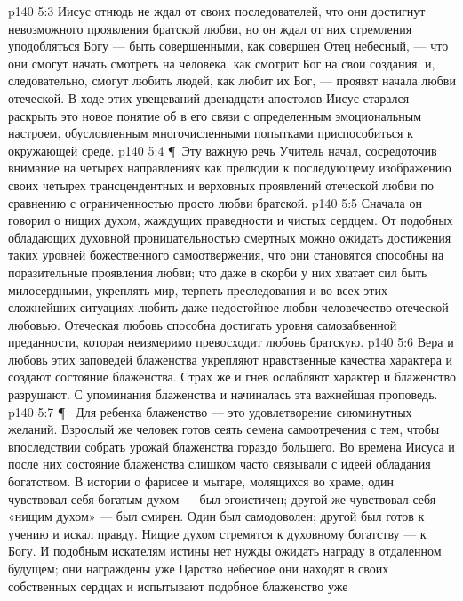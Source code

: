 \vs p140 5:3 Иисус отнюдь не ждал от своих последователей, что они достигнут невозможного проявления братской любви, но он ждал от них стремления уподобляться Богу --- быть совершенными, как совершен Отец небесный, --- что они смогут начать смотреть на человека, как смотрит Бог на свои создания, и, следовательно, смогут любить людей, как любит их Бог, --- проявят начала любви отеческой. В ходе этих увещеваний двенадцати апостолов Иисус старался раскрыть это новое понятие об  в его связи с определенным эмоциональным настроем, обусловленным многочисленными попытками приспособиться к окружающей среде.
\vs p140 5:4 \P\ Эту важную речь Учитель начал, сосредоточив внимание на четырех направлениях  как прелюдии к последующему изображению своих четырех трансцендентных и верховных проявлений отеческой любви по сравнению с ограниченностью просто любви братской.
\vs p140 5:5 Сначала он говорил о нищих духом, жаждущих праведности и чистых сердцем. От подобных обладающих духовной проницательностью смертных можно ожидать достижения таких уровней божественного самоотвержения, что они становятся способны на поразительные проявления  любви; что даже в скорби у них хватает сил быть милосердными, укреплять мир, терпеть преследования и во всех этих сложнейших ситуациях любить даже недостойное любви человечество отеческой любовью. Отеческая любовь способна достигать уровня самозабвенной преданности, которая неизмеримо превосходит любовь братскую.
\vs p140 5:6 Вера и любовь этих заповедей блаженства укрепляют нравственные качества характера и создают состояние блаженства. Страх же и гнев ослабляют характер и блаженство разрушают. С упоминания блаженства и начиналась эта важнейшая проповедь.
\vs p140 5:7 \P\ \bibnobreakspace {} Для ребенка блаженство --- это удовлетворение сиюминутных желаний. Взрослый же человек готов сеять семена самоотречения с тем, чтобы впоследствии собрать урожай блаженства гораздо большего. Во времена Иисуса и после них состояние блаженства слишком часто связывали с идеей обладания богатством. В истории о фарисее и мытаре, молящихся во храме, один чувствовал себя богатым духом --- был эгоистичен; другой же чувствовал себя «нищим духом» --- был смирен. Один был самодоволен; другой был готов к учению и искал правду. Нищие духом стремятся к духовному богатству --- к Богу. И подобным искателям истины нет нужды ожидать награду в отдаленном будущем; они награждены уже  Царство небесное они находят в своих собственных сердцах и испытывают подобное блаженство уже 
